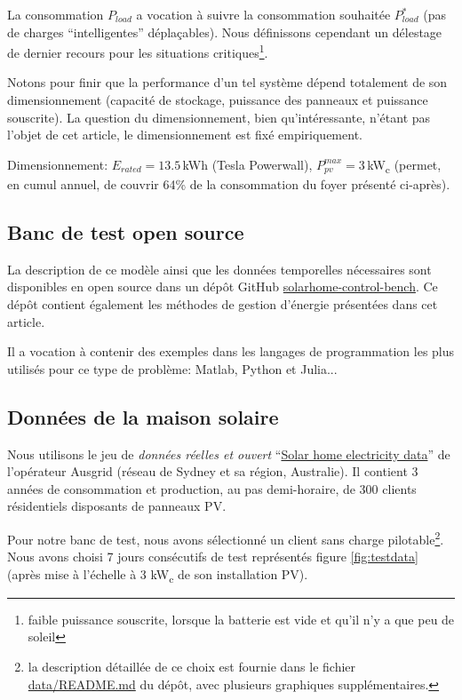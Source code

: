 \documentclass[a4paper,10pt,twocolumn]{article}
\begin{document}
La consommation $P_{load}$ a vocation à suivre la consommation souhaitée $P_{load}^*$
(pas de charges ``intelligentes'' déplaçables). Nous définissons cependant un délestage de dernier
recours pour les situations critiques\footnote{faible puissance souscrite, lorsque
la batterie est vide et qu'il n'y a que peu de soleil}.

Notons pour finir que la performance d'un tel système dépend totalement de son dimensionnement
(capacité de stockage, puissance des panneaux et  puissance souscrite).
La question du dimensionnement, bien qu'intéressante, n'étant pas l'objet de cet article,
le dimensionnement est fixé empiriquement.

Dimensionnement: $E_{rated}=13.5\,$kWh (Tesla Powerwall), $P_{pv}^{max}=3\,$kW\textsubscript{c} (permet, en cumul annuel, de couvrir 64\% de la consommation du foyer présenté ci-après).

\subsection{Banc de test open source}

La description de ce modèle ainsi que les données temporelles nécessaires sont
disponibles en open source dans un dépôt GitHub \href{https://github.com/pierre-haessig/solarhome-control-bench}{solarhome-control-bench}.
Ce dépôt contient également les méthodes de gestion d'énergie présentées dans cet article.

Il a vocation à contenir des exemples dans les langages de programmation les plus utilisés pour ce type de problème:
Matlab, Python et Julia...

\subsection{Données de la maison solaire}

Nous utilisons le jeu de \emph{données réelles et ouvert} ``\href{https://www.ausgrid.com.au/Common/About-us/Corporate-information/Data-to-share/Solar-home-electricity-data.aspx}{Solar home electricity data}'' de l'opérateur Ausgrid (réseau de Sydney et sa région, Australie).
Il contient 3 années de consommation et production, au pas demi-horaire, de 300 clients résidentiels disposants de panneaux PV.

Pour notre banc de test, nous avons sélectionné un client sans charge pilotable\footnote{
  la description détaillée de ce choix est fournie dans le fichier \href{https://github.com/pierre-haessig/solarhome-control-bench/blob/master/data/README.md}{data/README.md} du dépôt, avec plusieurs graphiques supplémentaires.}.
Nous avons choisi 7 jours consécutifs de test représentés figure \ref{fig:testdata} (après mise à l'échelle à 3 kW\textsubscript{c} de son installation PV).
\end{document}
